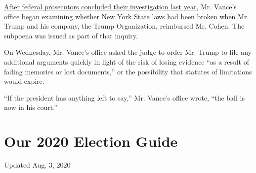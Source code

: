 \href{https://www.nytimes.com/2019/07/17/nyregion/michael-cohen-trump-investigation.html}{After
federal prosecutors concluded their investigation last year}, Mr.
Vance's office began examining whether New York State laws had been
broken when Mr. Trump and his company, the Trump Organization,
reimbursed Mr. Cohen. The subpoena was issued as part of that inquiry.

On Wednesday, Mr. Vance's office asked the judge to order Mr. Trump to
file any additional arguments quickly in light of the risk of losing
evidence ``as a result of fading memories or lost documents,'' or the
possibility that statutes of limitations would expire.

``If the president has anything left to say,'' Mr. Vance's office wrote,
``the ball is now in his court.''

\hypertarget{our-2020-election-guide}{%
\section{Our 2020 Election Guide}\label{our-2020-election-guide}}

Updated Aug. 3, 2020

